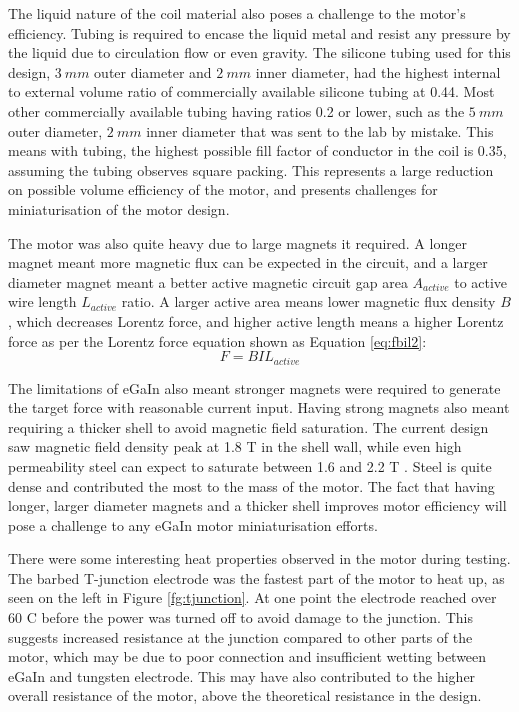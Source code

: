 \documentclass[a4paper,12pt]{article}
\begin{document}
The liquid nature of the coil material also poses a challenge to the motor's efficiency. Tubing is required to encase the liquid metal and resist any pressure by the liquid due to circulation flow or even gravity. The silicone tubing used for this design, $3\ mm$ outer diameter and $2\ mm$ inner diameter, had the highest internal to external volume ratio of commercially available silicone tubing at 0.44. Most other commercially available tubing having ratios 0.2 or lower, such as the $5\ mm$ outer diameter, $2\ mm$ inner diameter that was sent to the lab by mistake. This means with tubing, the highest possible fill factor of conductor in the coil is 0.35, assuming the tubing observes square packing. This represents a large reduction on possible volume efficiency of the motor, and presents challenges for miniaturisation of the motor design.

The motor was also quite heavy due to large magnets it required. A longer magnet meant more magnetic flux can be expected in the circuit, and a larger diameter magnet meant a better active magnetic circuit gap area $A_{active}$ to active wire length $L_{active}$ ratio. A larger active area means lower magnetic flux density $B$, which decreases Lorentz force, and higher active length means a higher Lorentz force as per the Lorentz force equation shown as Equation \ref{eq:fbil2}:
\begin{equation}\label{eq:fbil2}
    F = BIL_{active}
\end{equation}

The limitations of eGaIn also meant stronger magnets were required to generate the target force with reasonable current input. Having strong magnets also meant requiring a thicker shell to avoid magnetic field saturation. The current design saw magnetic field density peak at 1.8 T in the shell wall, while even high permeability steel can expect to saturate between 1.6 and 2.2 T \cite{laughtonElectricalEngineerReference2002}. Steel is quite dense and contributed the most to the mass of the motor. The fact that having longer, larger diameter magnets and a thicker shell improves motor efficiency will pose a challenge to any eGaIn motor miniaturisation efforts.

There were some interesting heat properties observed in the motor during testing. The barbed T-junction electrode was the fastest part of the motor to heat up, as seen on the left in Figure \ref{fg:tjunction}. At one point the electrode reached over 60 \degree C before the power was turned off to avoid damage to the junction. This suggests increased resistance at the junction compared to other parts of the motor, which may be due to poor connection and insufficient wetting between eGaIn and tungsten electrode. This may have also contributed to the higher overall resistance of the motor, above the theoretical resistance in the design.
\end{document}
